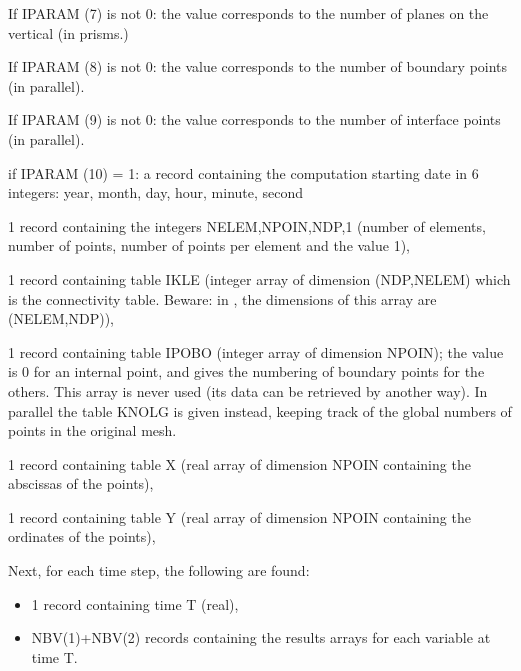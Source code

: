 If IPARAM (7) is not 0: the value corresponds to the number of planes on the
vertical (in prisms.)

If IPARAM (8) is not 0: the value corresponds to the number of boundary points
(in parallel).

If IPARAM (9) is not 0: the value corresponds to the number of interface points
(in parallel).

if IPARAM (10) = 1: a record containing the computation starting date in 6
integers: year, month, day, hour, minute, second

1 record containing the integers NELEM,NPOIN,NDP,1 (number of elements, number
of points, number of points per element and the value 1),

1 record containing table IKLE (integer array of dimension (NDP,NELEM) which is
the connectivity table. Beware: in , the dimensions of this array
are (NELEM,NDP)),

1 record containing table IPOBO (integer array of dimension NPOIN); the value
is 0 for an internal point, and gives the numbering of boundary points for the
others. This array is never used (its data can be retrieved by another way). In
parallel the table KNOLG is given instead, keeping track of the global numbers
of points in the original mesh.

1 record containing table X (real array of dimension NPOIN containing the
abscissas of the points),

1 record containing table Y (real array of dimension NPOIN containing the
ordinates of the points),

Next, for each time step, the following are found:
\begin{itemize}
  \item 1 record containing time T (real),
  \item NBV(1)+NBV(2) records containing the results arrays for each variable
    at time T.
\end{itemize}


